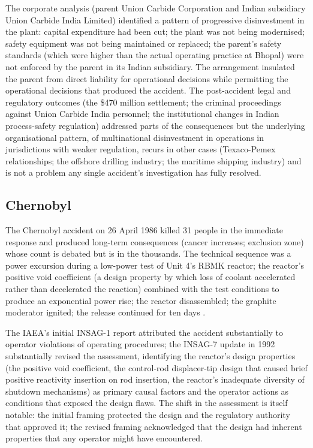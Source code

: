 The corporate analysis (parent Union Carbide Corporation and Indian subsidiary Union Carbide India Limited) identified a pattern of progressive disinvestment in the plant: capital expenditure had been cut; the plant was not being modernised; safety equipment was not being maintained or replaced; the parent's safety standards (which were higher than the actual operating practice at Bhopal) were not enforced by the parent in its Indian subsidiary. The arrangement insulated the parent from direct liability for operational decisions while permitting the operational decisions that produced the accident. The post-accident legal and regulatory outcomes (the \$470 million settlement; the criminal proceedings against Union Carbide India personnel; the institutional changes in Indian process-safety regulation) addressed parts of the consequences but the underlying organisational pattern, of multinational disinvestment in operations in jurisdictions with weaker regulation, recurs in other cases (Texaco-Pemex relationships; the offshore drilling industry; the maritime shipping industry) and is not a problem any single accident's investigation has fully resolved.

\subsection*{Chernobyl}

The Chernobyl accident on 26 April 1986 killed 31 people in the immediate response and produced long-term consequences (cancer increases; exclusion zone) whose count is debated but is in the thousands. The technical sequence was a power excursion during a low-power test of Unit 4's RBMK reactor; the reactor's positive void coefficient (a design property by which loss of coolant accelerated rather than decelerated the reaction) combined with the test conditions to produce an exponential power rise; the reactor disassembled; the graphite moderator ignited; the release continued for ten days \cite{acc:iaea-insag1-1986,acc:iaea-insag7-1992}.

The IAEA's initial INSAG-1 report attributed the accident substantially to operator violations of operating procedures; the INSAG-7 update in 1992 substantially revised the assessment, identifying the reactor's design properties (the positive void coefficient, the control-rod displacer-tip design that caused brief positive reactivity insertion on rod insertion, the reactor's inadequate diversity of shutdown mechanisms) as primary causal factors and the operator actions as conditions that exposed the design flaws. The shift in the assessment is itself notable: the initial framing protected the design and the regulatory authority that approved it; the revised framing acknowledged that the design had inherent properties that any operator might have encountered.

